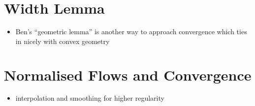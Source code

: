 \section{Width Lemma}

\begin{itemize}
\item Ben's ``geometric lemma'' is another way to approach convergence which ties in nicely with convex geometry
\end{itemize}

\section{Normalised Flows and Convergence}

\begin{itemize}
\item interpolation and smoothing for higher regularity
\end{itemize}
